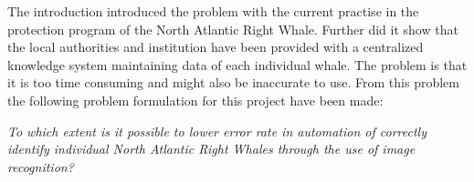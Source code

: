 The introduction introduced the problem with the current practise in the protection program of the North Atlantic Right Whale. Further did it show that the local authorities and institution have been provided with a centralized knowledge system maintaining data of each individual whale.
The problem is that it is too time consuming and might also be inaccurate to use.
From this problem the following problem formulation for this project have been made:

\begin{center}
\textit{To which extent is it possible to lower error rate in automation of correctly identify individual North Atlantic Right Whales through the use of image recognition?}
\end{center}
